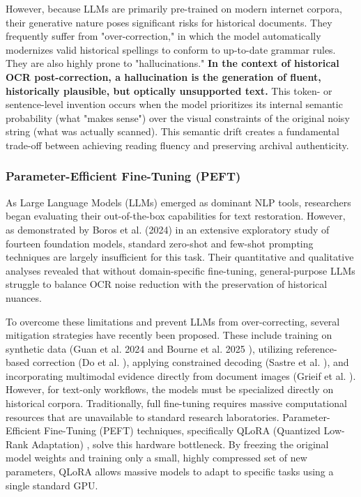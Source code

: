 \documentclass[11pt]{extarticle}
\begin{document}
However, because LLMs are primarily pre-trained on modern internet corpora, their generative nature poses significant risks for historical documents. They frequently suffer from "over-correction," in which the model automatically modernizes valid historical spellings to conform to up-to-date grammar rules. They are also highly prone to "hallucinations." \textbf{In the context of historical OCR post-correction, a hallucination is the generation of fluent, historically plausible, but optically unsupported text.} This token- or sentence-level invention occurs when the model prioritizes its internal semantic probability (what "makes sense") over the visual constraints of the original noisy string (what was actually scanned). This semantic drift creates a fundamental trade-off between achieving reading fluency and preserving archival authenticity.

\subsubsection{Parameter-Efficient Fine-Tuning (PEFT)}
As Large Language Models (LLMs) emerged as dominant NLP tools, researchers began evaluating their out-of-the-box capabilities for text restoration. However, as demonstrated by Boros et al. (2024) \cite{boros-etal-2024-post} in an extensive exploratory study of fourteen foundation models, standard zero-shot and few-shot prompting techniques are largely insufficient for this task. Their quantitative and qualitative analyses revealed that without domain-specific fine-tuning, general-purpose LLMs struggle to balance OCR noise reduction with the preservation of historical nuances.

To overcome these limitations and prevent LLMs from over-correcting, several mitigation strategies have recently been proposed. These include training on synthetic data (Guan et al. 2024 \cite{guan2024advancing} and Bourne et al. 2025 \cite{bourne2025scrambled}), utilizing reference-based correction (Do et al. \cite{do2025reference}), applying constrained decoding (Sastre et al. \cite{sastre2025postocr}), and incorporating multimodal evidence directly from document images (Grieif et al. \cite{greif2025multimodal}). However, for text-only workflows, the models must be specialized directly on historical corpora. Traditionally, full fine-tuning requires massive computational resources that are unavailable to standard research laboratories. Parameter-Efficient Fine-Tuning (PEFT) techniques, specifically QLoRA (Quantized Low-Rank Adaptation) \cite{dettmers2023qloraefficientfinetuningquantized}, solve this hardware bottleneck. By freezing the original model weights and training only a small, highly compressed set of new parameters, QLoRA allows massive models to adapt to specific tasks using a single standard GPU.
\end{document}
